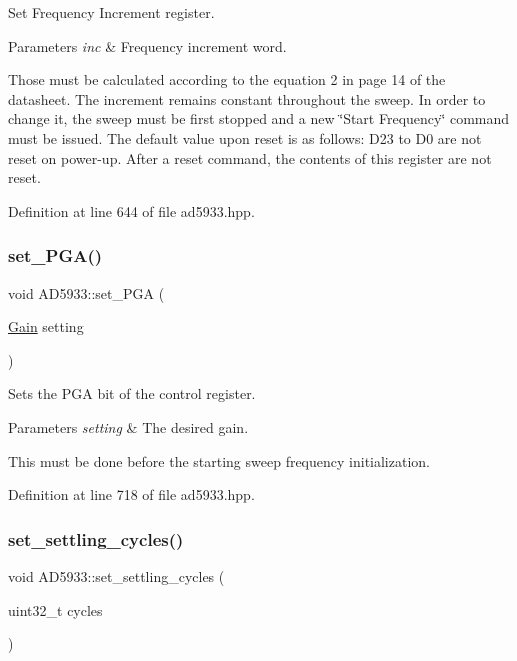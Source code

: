 Set Frequency Increment register. 


\begin{DoxyParams}{Parameters}
{\em inc} & Frequency increment word.\\
\hline
\end{DoxyParams}
Those must be calculated according to the equation 2 in page 14 of the datasheet. The increment remains constant throughout the sweep. In order to change it, the sweep must be first stopped and a new \char`\"{}\+Start Frequency\char`\"{} command must be issued. The default value upon reset is as follows\+: D23 to D0 are not reset on power-\/up. After a reset command, the contents of this register are not reset. 

Definition at line 644 of file ad5933.\+hpp.

\mbox{\label{struct_a_d5933_a7b534f2c2b7eb612db9e2a9a89020e19}} 
\subsubsection{\texorpdfstring{set\+\_\+\+P\+G\+A()}{set\_PGA()}}
{\footnotesize\ttfamily void A\+D5933\+::set\+\_\+\+P\+GA (\begin{DoxyParamCaption}\item[{\mbox{\hyperlink{ad5933_8hpp_a8bc3a010269d8968cd5e6a0c119ed1e1}{Gain}}}]{setting }\end{DoxyParamCaption})}



Sets the P\+GA bit of the control register. 


\begin{DoxyParams}{Parameters}
{\em setting} & The desired gain.\\
\hline
\end{DoxyParams}
This must be done before the starting sweep frequency initialization. 

Definition at line 718 of file ad5933.\+hpp.

\mbox{\label{struct_a_d5933_a210f3b7d58fdd3504d69d7ecba962662}} 
\subsubsection{\texorpdfstring{set\+\_\+settling\+\_\+cycles()}{set\_settling\_cycles()}}
{\footnotesize\ttfamily void A\+D5933\+::set\+\_\+settling\+\_\+cycles (\begin{DoxyParamCaption}\item[{uint32\+\_\+t}]{cycles }\end{DoxyParamCaption})}



